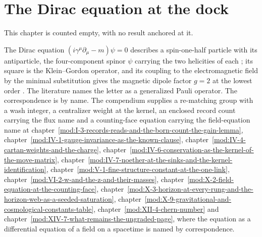 \section{The Dirac equation at the dock}\label{mod:V-9-dirac-equation-at-the-dock}
\begin{chtable}
This chapter is counted empty, with no result anchored at it.
\end{chtable}
\chdeps{}{}
\begin{chbridge}The Dirac equation $(i\gamma^{\mu}\partial_{\mu} - m)\psi = 0$ describes a spin-one-half particle with its antiparticle, the four-component spinor $\psi$ carrying the two helicities of each \cite{Dirac1928}; its square is the Klein--Gordon operator, and its coupling to the electromagnetic field by the minimal substitution gives the magnetic dipole factor $g = 2$ at the lowest order \cite{Peskin1995}. The literature names the letter as a generalized Pauli operator. The correspondence is by name. The compendium supplies a re-matching group with a wash integer, a centralizer weight at the kernel, an enclosed record count carrying the flux name and a counting-face equation carrying the field-equation name at chapter~\ref{mod:I-3-records-reads-and-the-born-count-the-gain-lemma}, chapter~\ref{mod:IV-1-gauge-invariance-as-the-known-clause}, chapter~\ref{mod:IV-4-cartan-weights-and-the-charge}, chapter~\ref{mod:IV-6-conservation-as-the-kernel-of-the-move-matrix}, chapter~\ref{mod:IV-7-noether-at-the-sinks-and-the-kernel-identification}, chapter~\ref{mod:V-1-fine-structure-constant-at-the-one-link}, chapter~\ref{mod:VI-2-w-and-the-z-and-their-masses}, chapter~\ref{mod:X-2-field-equation-at-the-counting-face}, chapter~\ref{mod:X-3-horizon-at-every-rung-and-the-horizon-web-as-a-seeded-saturation}, chapter~\ref{mod:X-9-gravitational-and-cosmological-constants-table}, chapter~\ref{mod:XII-4-chern-number} and chapter~\ref{mod:XIV-7-what-remains-the-ungraded-page}, where the equation as a differential equation of a field on a spacetime is named by correspondence.\end{chbridge}
